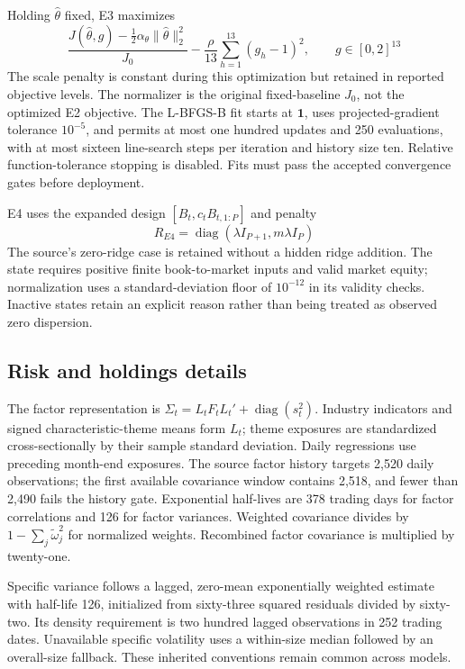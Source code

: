 \documentclass[12pt,letterpaper,fleqn]{article}
\newcommand{\diag}{\operatorname{diag}}
\begin{document}
Holding $\widehat\theta$ fixed, E3 maximizes
\begin{equation}\label{eq:e3objective}
 \frac{J(\widehat\theta,g)-\tfrac12\alpha_\theta\|\widehat\theta\|_2^2}{J_0}
       -\frac{\rho}{13}\sum_{h=1}^{13}(g_h-1)^2,
       \qquad g\in[0,2]^{13}
\end{equation}
The scale penalty is constant during this optimization but retained in reported objective levels. The normalizer is the original fixed-baseline $J_0$, not the optimized E2 objective. The L-BFGS-B fit starts at $\mathbf1$, uses projected-gradient tolerance $10^{-5}$, and permits at most one hundred updates and 250 evaluations, with at most sixteen line-search steps per iteration and history size ten. Relative function-tolerance stopping is disabled. Fits must pass the accepted convergence gates before deployment.

E4 uses the expanded design $[B_t,c_tB_{t,1:P}]$ and penalty
\begin{equation}
 R_{E4}=\diag(\lambda I_{P+1},m\lambda I_P)
\end{equation}
The source's zero-ridge case is retained without a hidden ridge addition. The state requires positive finite book-to-market inputs and valid market equity; normalization uses a standard-deviation floor of $10^{-12}$ in its validity checks. Inactive states retain an explicit reason rather than being treated as observed zero dispersion.

\subsection{Risk and holdings details}
The factor representation is $\Sigma_t=L_tF_tL_t'+\diag(s_t^2)$. Industry indicators and signed characteristic-theme means form $L_t$; theme exposures are standardized cross-sectionally by their sample standard deviation. Daily regressions use preceding month-end exposures. The source factor history targets 2,520 daily observations; the first available covariance window contains 2,518, and fewer than 2,490 fails the history gate. Exponential half-lives are 378 trading days for factor correlations and 126 for factor variances. Weighted covariance divides by $1-\sum_j\widetilde\omega_j^2$ for normalized weights. Recombined factor covariance is multiplied by twenty-one.

Specific variance follows a lagged, zero-mean exponentially weighted estimate with half-life 126, initialized from sixty-three squared residuals divided by sixty-two. Its density requirement is two hundred lagged observations in 252 trading dates. Unavailable specific volatility uses a within-size median followed by an overall-size fallback. These inherited conventions remain common across models.
\end{document}
